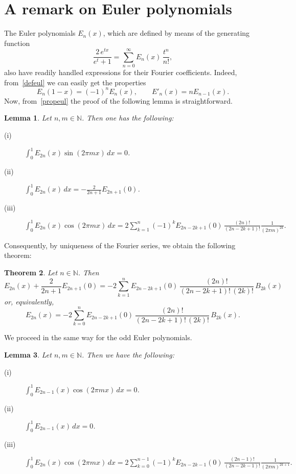 \documentclass[a4paper,reqno]{amsart}
\newcommand{\N}{\mathbb{N}}
\theoremstyle{plain}
\newtheorem{Teor}{Theorem}[section]
\newtheorem{Lema}[Teor]{Lemma}
\numberwithin{equation}{section}
\theoremstyle{remark}
\begin{document}
\section{A remark on Euler polynomials}
\label{sec:BerEu}

The Euler polynomials $E_n(x)$, which are defined by means of the generating function
\begin{equation}
\label{defeul}
  \frac{2\,e^{tx}}{e^{t}+1} = \sum_{n=0}^\infty E_n(x)\, \frac{t^n}{n!},
\end{equation}
also have readily handled expressions for their Fourier coefficients. Indeed, from~\eqref{defeul} we can easily get the properties
\begin{equation}
\label{propeul}
  E_n(1-x) = (-1)^n E_n(x), \qquad E'_n(x) = n E_{n-1}(x).
\end{equation}
Now, from~\eqref{propeul} the proof of the following lemma is straightforward.

\begin{Lema} 
Let $n,m \in\N$. Then one has the following:
\begin{description}
  \item[(i)] $\displaystyle \int_0^1 E_{2n}(x) \sin(2\pi mx)\,dx = 0$.
  \item[(ii)] $\displaystyle \int_0^1 E_{2n}(x) \,dx = -\frac{2}{2n+1}E_{2n+1}(0)$.
  \item[(iii)] $\displaystyle \int_0^1 E_{2n}(x) \cos(2\pi mx)\,dx
  = 2 \sum_{k=1}^n (-1)^k E_{2n-2k+1}(0)\, \frac{(2n)!}{(2n-2k+1)!} \frac{1}{(2\pi m)^{2k}}.$
\end{description}
\end{Lema}

Consequently, by uniqueness of the Fourier series, we obtain the following theorem:

\begin{Teor} 
Let $n\in\N$. Then
\[
  E_{2n}(x) + \frac{2}{2n+1}E_{2n+1}(0) = 
  -2 \sum_{k=1}^n E_{2n-2k+1}(0)\, \frac{(2n)!}{(2n-2k+1)!\,(2k)!}\,B_{2k}(x)
\]
or, equivalently,
\[
  E_{2n}(x) = -2 \sum_{k=0}^n E_{2n-2k+1}(0)\, \frac{(2n)!}{(2n-2k+1)!\,(2k)!}\,B_{2k}(x).
\]
\end{Teor}

We proceed in the same way for the odd Euler polynomials.

\begin{Lema} 
Let $n,m\in\N$. Then we have the following:
\begin{description}
  \item[(i)] $\displaystyle \int_0^1 E_{2n-1}(x) \cos(2\pi mx)\,dx = 0$.
  \item[(ii)] $\displaystyle \int_0^1 E_{2n-1}(x) \,dx = 0$.
  \item[(iii)] $\displaystyle \int_0^1 E_{2n}(x) \cos(2\pi mx)\,dx
  = 2\sum_{k=0}^{n-1} (-1)^k E_{2n-2k-1}(0) \, \frac{(2n-1)!}{(2n-2k-1)!} \frac{1}{(2\pi m)^{2k+1}}.$
\end{description}
\end{Lema}
\end{document}
